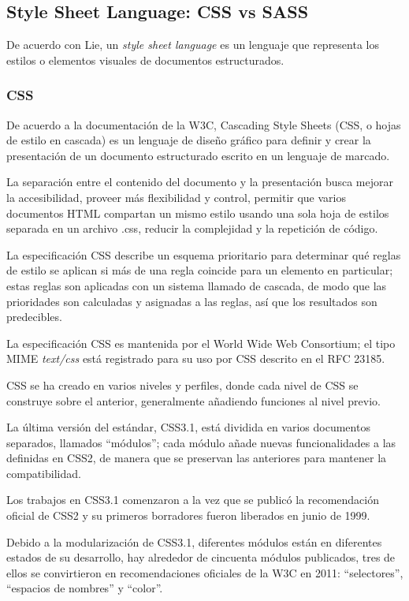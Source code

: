 \subsection{Style Sheet Language: CSS vs SASS}
De acuerdo con Lie\cite{lie_cascading_2005}, un \textit{style sheet language} es un lenguaje que representa los estilos o elementos visuales de documentos estructurados.

\subsubsection*{CSS}
De acuerdo a la documentación de la W3C\cite{noauthor_what_nodate}, Cascading Style Sheets (CSS, o hojas de estilo en cascada) es un lenguaje de diseño gráfico para definir y crear la presentación de un documento estructurado escrito en un lenguaje de marcado.


La separación entre el contenido del documento y la presentación busca mejorar la accesibilidad, proveer más flexibilidad y control, permitir que varios documentos HTML compartan un mismo estilo usando una sola hoja de estilos separada en un archivo .css, reducir la complejidad y la repetición de código.


La especificación CSS describe un esquema prioritario para determinar qué reglas de estilo se aplican si más de una regla coincide para un elemento en particular; estas reglas son aplicadas con un sistema llamado de cascada, de modo que las prioridades son calculadas y asignadas a las reglas, así que los resultados son predecibles.


La especificación CSS es mantenida por el World Wide Web Consortium; el tipo MIME \textit{text/css} está registrado para su uso por CSS descrito en el RFC 23185​. 


CSS se ha creado en varios niveles y perfiles, donde cada nivel de CSS se construye sobre el anterior, generalmente añadiendo funciones al nivel previo.


La última versión del estándar, CSS3.1, está dividida en varios documentos separados, llamados ``módulos''; cada módulo añade nuevas funcionalidades a las definidas en CSS2, de manera que se preservan las anteriores para mantener la compatibilidad.


Los trabajos en CSS3.1 comenzaron a la vez que se publicó la recomendación oficial de CSS2 y su primeros borradores fueron liberados en junio de 1999.


Debido a la modularización de CSS3.1, diferentes módulos están en diferentes estados de su desarrollo,​ hay alrededor de cincuenta módulos publicados,​ tres de ellos se convirtieron en recomendaciones oficiales de la W3C en 2011: ``selectores'', ``espacios de nombres'' y ``color''.


